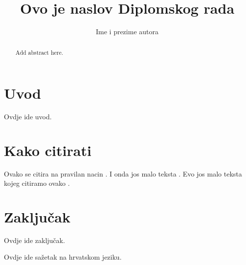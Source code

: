 \documentclass[times, utf8, diplomski, numeric]{templates/template}
\begin{document}

\title{Ovo je naslov Diplomskog rada}


\author{Ime i prezime autora}

\maketitle

\izvornik


\tableofcontents

\chapter{Uvod}
Ovdje ide uvod.

\chapter{Kako citirati}
Ovako se citira na pravilan nacin \cite{oetiket2007lshort}. I onda jos malo teksta \cite{downes2002shortams}. 
Evo jos malo teksta kojeg citiramo ovako \cite{ungar2002uvod}.

\chapter{Zaključak}
Ovdje ide zaključak.




\begin{sazetak}
Ovdje ide sažetak na hrvatskom jeziku.

\end{sazetak}

\begin{abstract}
Add abstract here.

\end{abstract}
\end{document}
